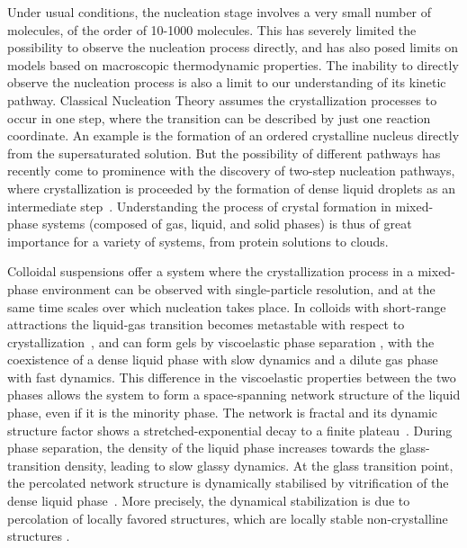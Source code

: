 \documentclass[12pt]{article}
\begin{document}
Under usual conditions, the nucleation stage involves a very small number of molecules, of the order of 10-1000 molecules.
This has severely limited the possibility to observe the nucleation process directly, and has also posed limits on
models based on macroscopic thermodynamic properties. 
The inability to directly observe the nucleation process is also a limit to our understanding of its kinetic pathway. 
Classical Nucleation Theory assumes the crystallization processes to occur in one step,
where the transition can be described by just one reaction coordinate. An example is the formation of an ordered crystalline nucleus
directly from the supersaturated solution. But the possibility of different pathways has recently come to prominence with
the discovery of two-step nucleation pathways, where crystallization is proceeded by the formation of dense liquid  droplets as an intermediate step~\cite{ten1997enhancement,SearR,savage2009experimental,vekilov2010two,palberg2014crystallization}.
Understanding the process of crystal formation in mixed-phase systems (composed of gas, liquid, and solid phases) is thus
of great importance for a variety of systems, from protein solutions to clouds. 

Colloidal suspensions offer a system where the crystallization process in a mixed-phase environment can be observed with single-particle
resolution, and at the same time scales over which nucleation takes place. In colloids with short-range attractions the liquid-gas transition 
becomes metastable with respect to crystallization~\cite{anderson2002insights,lekkerkerker2011colloids}, and can form gels
by viscoelastic phase separation \cite{tanaka1999colloid,tanaka2000viscoelastic}, with the coexistence of a dense liquid phase with slow dynamics and a dilute gas phase with fast dynamics. 
This difference in the viscoelastic properties between the two phases allows the system to form a space-spanning 
network structure of the liquid phase, even if it is the minority phase. The network is fractal and its dynamic structure factor shows a stretched-exponential decay to a finite
plateau~\cite{krall1998internal,solomon2001dynamic,romer2000sol}. 
During phase separation, the density of the liquid phase increases towards the glass-transition density, leading to slow glassy dynamics.
At the glass transition point, the percolated network structure is dynamically stabilised by vitrification 
of the dense liquid phase~\cite{pusey1993dynamics,ilett1995phase,verhaegh1997transient,tanaka1999colloid,foffi2002,buzzaccaro2007sticky,zaccarelli2007,lu2008gelation,zaccarelli2008gelation,testard2011}.  
More precisely, the dynamical stabilization is due to percolation of locally favored structures, which are locally stable non-crystalline structures \cite{royall2008g}.
\end{document}
